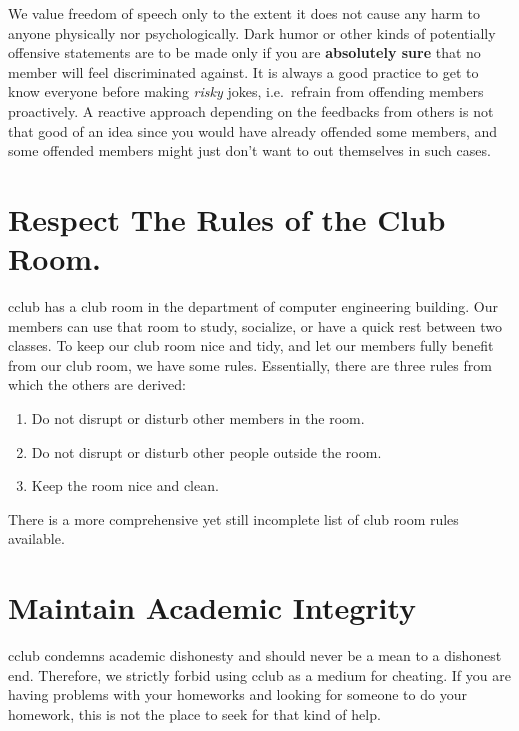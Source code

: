 \documentclass{article}
\begin{document}
We value freedom of speech only to the extent it does not cause any harm to
anyone physically nor psychologically. Dark humor or other kinds of potentially
offensive statements are to be made only if you are \textbf{absolutely sure}
that no member will feel discriminated against. It is always a good practice to
get to know everyone before making \textit{risky} jokes, i.e.\ refrain from
offending members proactively.  A reactive approach depending on the feedbacks
from others is not that good of an idea since you would have already offended
some members, and some offended members might just don't want to out themselves
in such cases.

\section*{Respect The Rules of the Club Room.}
cclub has a club room in the department of computer engineering building. Our
members can use that room to study, socialize, or have a quick rest between two
classes. To keep our club room nice and tidy, and let our members fully benefit
from our club room, we have some rules. Essentially, there are three rules from
which the others are derived:
\begin{enumerate}
		\item Do not disrupt or disturb other members in the room.
		\item Do not disrupt or disturb other people outside the room.
		\item Keep the room nice and clean.
\end{enumerate}

There is a more comprehensive yet still incomplete list of club room rules available.

\section*{Maintain Academic Integrity}
cclub condemns academic dishonesty and should never be a mean to a dishonest
end. Therefore, we strictly forbid using cclub as a medium for cheating. If you
are having problems with your homeworks and looking for someone to do your
homework, this is not the place to seek for that kind of help.
\end{document}
